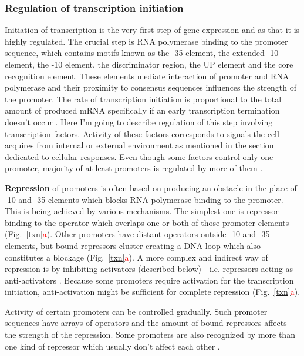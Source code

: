 \subsubsection{Regulation of transcription initiation}
Initiation of transcription is the very first step of gene expression and as that it is highly regulated.
The crucial step is RNA polymerase binding to the promoter sequence, which contains motifs known as the -35 element, the extended -10 element, the -10 element, the
discriminator region, the UP element and the core recognition element.
These elements mediate interaction of promoter and RNA polymerase and their proximity to consensus sequences influences the strength of the promoter.
The rate of transcription initiation is proportional to the total amount of produced mRNA specifically if an early transcription termination doesn't occur \cite{kennell1977transcription, iyer1996absolute}.
Here I'm going to describe regulation of this step involving transcription factors.
Activity of these factors corresponds to signals the cell acquires from internal or external environment as mentioned in the section dedicated to cellular responses.
Even though some factors control only one promoter, majority of at least  promoters is regulated by more of them \cite{karp2014ecocyc}.

\textbf{Repression} of promoters is often based on producing an obstacle in the place of -10 and -35 elements which blocks RNA polymerase binding to the promoter.
This is being achieved by various mechanisms.
The simplest one is repressor binding to the operator which overlaps one or both of those promoter elements \cite{brent1981mechanism} (Fig.~\ref{txn}\textcolor{red}{a}).
Other promoters have distant operators outside -10 and -35 elements, but bound repressors cluster creating a DNA loop which also constitutes a blockage \cite{semsey2004dna} (Fig.~\ref{txn}\textcolor{red}{a}).
A more complex and indirect way of repression is by inhibiting activators (described below) - i.e. repressors acting as anti-activators \cite{sogaard1993protein}.
Because some promoters require activation for the transcription initiation, anti-activation might be sufficient for complete repression (Fig.~\ref{txn}\textcolor{red}{a}).

Activity of certain promoters can be controlled gradually.
Such promoter sequences have arrays of operators and the amount of bound repressors affects the strength of the repression.
Some promoters are also recognized by more than one kind of repressor which usually don't affect each other \cite{el2009repression}.

